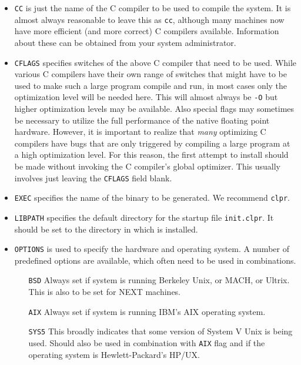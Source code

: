 \begin{itemize}

\item {\tt CC} is just the name of the C compiler to be used to compile the
\CLPR{} system. It is almost always reasonable to leave this as {\tt cc}, 
although many machines now have more efficient (and more correct) C compilers 
available. Information about these can be obtained from your system 
administrator.

\item {\tt CFLAGS} specifies switches of the above C compiler that need to 
be used. While various C compilers have their own range of switches that might
have to be used to make such a large program compile and run, in most
cases only the optimization level will be needed here. This will almost 
always be {\tt -O} but higher optimization levels may be available.
Also special flags may sometimes be necessary to utilize the
full performance of the native floating point hardware. 
However, it is important to realize that {\em many} 
optimizing C compilers have bugs that are only triggered by compiling 
a large program at a high optimization level. For this reason, the first 
attempt to install \CLPR{} should be made without invoking the C compiler's 
global optimizer. This usually involves just leaving the {\tt CFLAGS} field 
blank.

\item {\tt EXEC} specifies the name of the \CLPR{} binary to be generated. 
We recommend {\tt clpr}.

\item {\tt LIBPATH} specifies the default directory for the startup file
{\tt init.clpr}. It should be set to the directory in which \CLPR{} is
installed.

\item {\tt OPTIONS} is used to specify the hardware and operating system. 
A number of predefined options are available, which often need to be used 
in combinations.
\begin{enumerate}

\item[{\tt BSD}] Always set if system is running Berkeley Unix, or MACH,
or Ultrix. This is also to be set for NEXT machines.

\item[{\tt AIX}] Always set if system is running IBM's AIX operating system.

\item[{\tt SYS5}] This broadly indicates that some version of System V Unix
is being used. Should also be used in combination with {\tt AIX} flag and
if the operating system is Hewlett-Packard's HP/UX.


\end{enumerate}
\end{itemize}
